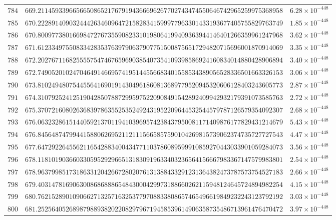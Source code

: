 \documentclass[12pt,reqno]{amsart}
\theoremstyle{remark}
\begin{document}
\begin{longtable}{clc}
$784$ & $669.2114593396656650865217679194366696267702743474550646742965259975368958$ & $6.28\times 10^{-448}$ \\
$785$ & $670.2228914090324442634609647215828341599977963301433193677405755829763749$ & $1.85\times 10^{-448}$ \\
$786$ & $670.8009773801669847276735590823310198064199409363944146401266359961247968$ & $3.62\times 10^{-448}$ \\
$787$ & $671.6123349755083342835376397906379077515008756517294820715696001870914069$ & $3.35\times 10^{-448}$ \\
$788$ & $672.2027671168255557547467659690385407354109398586924160834014880428906894$ & $3.40\times 10^{-448}$ \\
$789$ & $672.7490520102470464914669574195144556683401558534389056528336501663326153$ & $3.06\times 10^{-448}$ \\
$790$ & $673.8102494807544556416901914304961860813689779520945320606128403243605773$ & $2.87\times 10^{-448}$ \\
$791$ & $674.3107925241251904285078872995975220908491542892409942932179391073585763$ & $2.72\times 10^{-448}$ \\
$792$ & $675.3707216080263683978635525352492431952209644532544579787126579354092307$ & $2.68\times 10^{-448}$ \\
$793$ & $676.0632328615144059213701194103969574238437950081171409876177829431214679$ & $5.43\times 10^{-448}$ \\
$794$ & $676.8456487479944158806269521121115665857590104269815739062374735727727543$ & $4.47\times 10^{-448}$ \\
$795$ & $677.6472922645562116542883400434771103786089599910859270443033901059284073$ & $3.56\times 10^{-448}$ \\
$796$ & $678.1181019036603305952929665131830919633403236564156667983367147579983801$ & $2.54\times 10^{-448}$ \\
$797$ & $678.9637998517318633120426672802076131388433291231364382473787573754527183$ & $2.66\times 10^{-448}$ \\
$798$ & $679.4031478169063008686888654843000429973188660262115948124645724894982254$ & $4.15\times 10^{-448}$ \\
$799$ & $680.7621528901090662713257163253779708833808657465496619849232243123792192$ & $3.03\times 10^{-448}$ \\
$800$ & $681.2525640526898798893820220829796719458539614906358735486713961476470472$ & $3.97\times 10^{-448}$ \\

\end{longtable}
\end{document}
